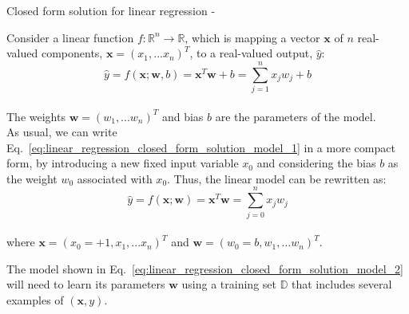 %
%
%

\begin{frame}[t,allowframebreaks]{Closed form solution for linear regression -} 

    Consider a linear function 
    $f: \mathbb{R}^{n} \rightarrow \mathbb{R}$,
    which is mapping a vector $\mathbf{x}$ of 
    $n$ real-valued components, $\mathbf{x}=(x_1,...x_{n})^T$,
    to a real-valued output, $\hat{y}$:\\
    \vspace{-0.2cm}
    \begin{equation}
        \hat{y} = f(\mathbf{x};\mathbf{w},b) = 
        \mathbf{x}^{T} \mathbf{w} + b =
        \sum_{j=1}^{n} x_j w_j + b 
        \label{eq:linear_regression_closed_form_solution_model_1}
    \end{equation}\\
    \vspace{-0.1cm}
    The weights $\mathbf{w}=(w_1,...w_{n})^T$ and bias $b$ are the 
    parameters of the model.\\
    \vspace{0.2cm}
    As usual, we can write Eq.~\ref{eq:linear_regression_closed_form_solution_model_1}
    in a more compact form, by
    introducing a new fixed input variable $x_0$ and
    considering the bias $b$ as the weight $w_0$ associated with $x_0$.
    Thus, the linear model can be rewritten as:\\
    \vspace{-0.2cm}
    \begin{equation}
        \hat{y} = f(\mathbf{x};\mathbf{w}) = 
        \mathbf{x}^{T} \mathbf{w} =
        \sum_{j=0}^{n} x_j w_j 
        \label{eq:linear_regression_closed_form_solution_model_2}
    \end{equation}\\
    \vspace{-0.1cm}
    where $\mathbf{x}=(x_0=+1, x_1,...x_{n})^T$ and $\mathbf{w}=(w_0=b, w_1,...w_{n})^T$.\\

    \framebreak

    The model shown in Eq.~\ref{eq:linear_regression_closed_form_solution_model_2}
    will need to learn its parameters $\mathbf{w}$ using a training set $\mathbb{D}$
    that includes several examples of $(\mathbf{x},y)$.\\
    \vspace{0.2cm}


\end{frame}
